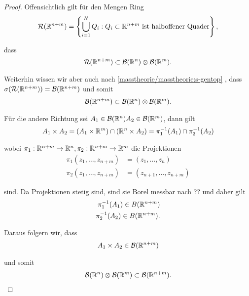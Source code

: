 \begin{proof}
 Offensichtlich gilt für den Mengen Ring
\begin{align*}
\mathcal{R}(\mathbb{R}^{n+m})=\left\{\bigcup_{i=1}^N Q_i: Q_i\subset\mathbb{R}^{n+m}\text{ ist halboffener Quader} \right\},
\end{align*}
\par
dass
\begin{align*}
\mathcal{R}(\mathbb{R}^{n+m})\subset \mathcal{B}(\mathbb{R}^n)\otimes \mathcal{B}(\mathbb{R}^m).
\end{align*}
\par
Weiterhin wissen wir aber auch nach \cref{masstheorie/masstheorie:s-gentop} , dass \(\sigma(\mathcal{R}(\mathbb{R}^{n+m})) = \mathcal{B}(\mathbb{R}^{n+m})\) und somit
\begin{align*}
\mathcal{B}(\mathbb{R}^{n+m})\subset \mathcal{B}(\mathbb{R}^n)\otimes \mathcal{B}(\mathbb{R}^m).
\end{align*}
\par
Für die andere Richtung sei \(A_1\in\mathcal{B}(\mathbb{R}^n) A_2\in\mathcal{B}(\mathbb{R}^m)\), dann gilt
\begin{align*}
A_1\times A_2 = \left(A_1\times\mathbb{R}^m\right) \cap (\mathbb{R}^n\times A_2) =\pi_1^{-1}(A_1) \cap \pi_2^{-1}(A_2)
\end{align*}
\par
wobei \(\pi_1:\mathbb{R}^{n+m}\to\mathbb{R}^n,\pi_2:\mathbb{R}^{n+m}\to\mathbb{R}^m\) die Projektionen
\begin{align*}
\pi_1(z_1,\ldots,z_{n+m})&= (z_1,\ldots, z_n)\\
\pi_2(z_1,\ldots,z_{n+m})&= (z_{n+1},\ldots, z_{n+m})
\end{align*}
\par
sind. Da Projektionen stetig sind, sind sie Borel messbar nach ?? und daher gilt
\begin{align*}
\pi_1^{-1}(A_1)\in B(\mathbb{R}^{n+m})\\
\pi_2^{-1}(A_2)\in B(\mathbb{R}^{n+m}).
\end{align*}
\par
Daraus folgern wir, dass
\begin{align*}
A_1\times A_2 \in \mathcal{B}(\mathbb{R}^{n+m})
\end{align*}
\par
und somit
\begin{align*}
\mathcal{B}(\mathbb{R}^n)\otimes \mathcal{B}(\mathbb{R}^m)\subset\mathcal{B}(\mathbb{R}^{n+m}).
\end{align*}\end{proof}

